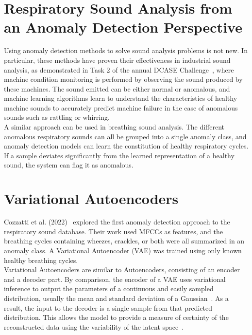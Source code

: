 \section{Respiratory Sound Analysis from an Anomaly Detection Perspective}
Using anomaly detection methods to solve sound analysis problems is not new. In particular, these methods have proven their effectiveness in industrial sound analysis, as demonstrated in Task 2 of the annual DCASE Challenge~\cite{dcaseDCASE2023Challenge}, where machine condition monitoring is performed by observing the sound produced by these machines. The sound emitted can be either normal or anomalous, and machine learning algorithms learn to understand the characteristics of healthy machine sounds to accurately predict machine failure in the case of anomalous sounds such as rattling or whirring.\\
A similar approach can be used in breathing sound analysis. The different anomalous respiratory sounds can all be grouped into a single anomaly class, and anomaly detection models can learn the constitution of healthy respiratory cycles. If a sample deviates significantly from the learned representation of a healthy sound, the system can flag it as anomalous.


\section{Variational Autoencoders}
Cozzatti et al. (2022)~\cite{cozzatti2022variational} explored the first anomaly detection approach to the respiratory sound database. Their work used MFCCs as features, and the breathing cycles containing wheezes, crackles, or both were all summarized in an anomaly class. A Variational Autoencoder (VAE) was trained using only known healthy breathing cycles.\\
Variational Autoencoders are similar to Autoencoders, consisting of an encoder and a decoder part. By comparison, the encoder of a VAE uses variational inference to output the parameters of a continuous and easily sampled distribution, usually the mean and standard deviation of a  Gaussian~\cite{cozzatti2022variational}. As a result, the input to the decoder is a single sample from that predicted distribution. This allows the model to provide a measure of certainty of the reconstructed data using the variability of the latent space~\cite{an2015variational}.\\

